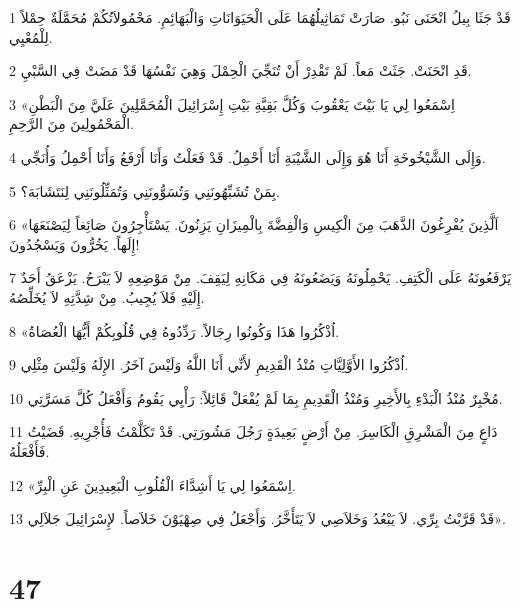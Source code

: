 \par 1 قَدْ جَثَا بِيلُ انْحَنَى نَبُو. صَارَتْ تَمَاثِيلُهُمَا عَلَى الْحَيَوَانَاتِ وَالْبَهَائِمِ. مَحْمُولاَتُكُمْ مُحَمَّلَةٌ حِمْلاً لِلْمُعْيِي.
\par 2 قَدِ انْحَنَتْ. جَثَتْ مَعاً. لَمْ تَقْدِرْ أَنْ تُنَجِّيَ الْحِمْلَ وَهِيَ نَفْسُهَا قَدْ مَضَتْ فِي السَّبْيِ.
\par 3 «اِسْمَعُوا لِي يَا بَيْتَ يَعْقُوبَ وَكُلَّ بَقِيَّةِ بَيْتِ إِسْرَائِيلَ الْمُحَمَّلِينَ عَلَيَّ مِنَ الْبَطْنِ الْمَحْمُولِينَ مِنَ الرَّحِمِ.
\par 4 وَإِلَى الشَّيْخُوخَةِ أَنَا هُوَ وَإِلَى الشَّيْبَةِ أَنَا أَحْمِلُ. قَدْ فَعَلْتُ وَأَنَا أَرْفَعُ وَأَنَا أَحْمِلُ وَأُنَجِّي.
\par 5 بِمَنْ تُشَبِّهُونَنِي وَتُسَوُّونَنِي وَتُمَثِّلُونَنِي لِنَتَشَابَهَ؟.
\par 6 «اَلَّذِينَ يُفْرِغُونَ الذَّهَبَ مِنَ الْكِيسِ وَالْفِضَّةَ بِالْمِيزَانِ يَزِنُونَ. يَسْتَأْجِرُونَ صَائِغاً لِيَصْنَعَهَا إِلَهاً. يَخُرُّونَ وَيَسْجُدُونَ!
\par 7 يَرْفَعُونَهُ عَلَى الْكَتِفِ. يَحْمِلُونَهُ وَيَضَعُونَهُ فِي مَكَانِهِ لِيَقِفَ. مِنْ مَوْضِعِهِ لاَ يَبْرَحُ. يَزْعَقُ أَحَدٌ إِلَيْهِ فَلاَ يُجِيبُ. مِنْ شِدَّتِهِ لاَ يُخَلِّصُهُ.
\par 8 «اُذْكُرُوا هَذَا وَكُونُوا رِجَالاً. رَدِّدُوهُ فِي قُلُوبِكُمْ أَيُّهَا الْعُصَاةُ.
\par 9 اُذْكُرُوا الأَوَّلِيَّاتِ مُنْذُ الْقَدِيمِ لأَنِّي أَنَا اللَّهُ وَلَيْسَ آخَرُ. الإِلَهُ وَلَيْسَ مِثْلِي.
\par 10 مُخْبِرٌ مُنْذُ الْبَدْءِ بِالأَخِيرِ وَمُنْذُ الْقَدِيمِ بِمَا لَمْ يُفْعَلْ قَائِلاً: رَأْيِي يَقُومُ وَأَفْعَلُ كُلَّ مَسَرَّتِي.
\par 11 دَاعٍ مِنَ الْمَشْرِقِ الْكَاسِرَ. مِنْ أَرْضٍ بَعِيدَةٍ رَجُلَ مَشُورَتِي. قَدْ تَكَلَّمْتُ فَأُجْرِيهِ. قَضَيْتُ فَأَفْعَلُهُ.
\par 12 «اِسْمَعُوا لِي يَا أَشِدَّاءَ الْقُلُوبِ الْبَعِيدِينَ عَنِ الْبِرِّ.
\par 13 قَدْ قَرَّبْتُ بِرِّي. لاَ يَبْعُدُ وَخَلاَصِي لاَ يَتَأَخَّرُ. وَأَجْعَلُ فِي صِهْيَوْنَ خَلاَصاً. لإِسْرَائِيلَ جَلاَلِي».

\chapter{47}

